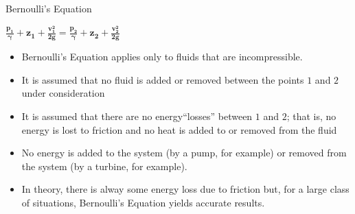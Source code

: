 \documentclass[9pt,xcolor={svgnames, x11names},professionalfonts, mathserif]{beamer}
\begin{document}

\begin{frame}{Bernoulli's Equation}
	\begin{center}
		\begin{minipage}{0.7\textwidth}
			\begin{mybox}[title=Bernoulli's Equation]
				\centering\Large
				$\bm{ \frac{p_1}{\gamma}+z_1+\frac{v_1^2}{2g}=\frac{p_2}{\gamma}+z_2+\frac{v_2^2}{2g}} $
			\end{mybox}
		\end{minipage}
		\begin{itemize}
			\item Bernoulli's Equation applies only to fluids that are incompressible.\pause
			\item It is assumed that no fluid is added or removed between the points $1$ and $2$ under consideration\pause
			\item It is assumed that there are no energy``losses'' between $1$ and $2$; that is, no energy is lost to friction
			      and no heat is added to or removed from the fluid\pause
			\item No energy is added to the system (by a pump, for example) or removed from the system (by a turbine, for example).\pause
			\item In theory, there is alway some energy loss due to friction but, for a large class of situations,
			      Bernoulli's Equation yields accurate results.
		\end{itemize}
	\end{center}
	
\end{frame}

\end{document}

